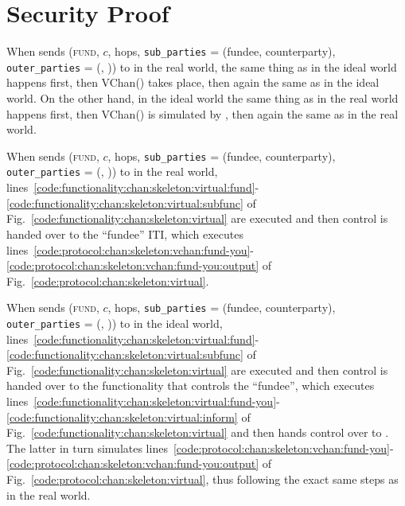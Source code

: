 \section{Security Proof}
  When \environment sends (\textsc{fund}, $c$, hops, \texttt{sub\_parties} =
  (fundee, counterparty), \texttt{outer\_parties} = (\charlie, \dave)) to \alice
  in the real world, the same thing as in the ideal world happens first, then
  VChan() takes place, then again the same as in the ideal world. On the other
  hand, in the ideal world the same thing as in the real world happens first,
  then VChan() is simulated by \simulator, then again the same as in the real
  world.

  When \environment sends (\textsc{fund}, $c$, hops, \texttt{sub\_parties} =
  (fundee, counterparty), \texttt{outer\_parties} = (\charlie, \dave)) to \alice
  in the real world,
  lines~\ref{code:functionality:chan:skeleton:virtual:fund}-\ref{code:functionality:chan:skeleton:virtual:subfunc}
  of Fig.~\ref{code:functionality:chan:skeleton:virtual} are executed and then
  control is handed over to the ``fundee'' ITI, which executes
  lines~\ref{code:protocol:chan:skeleton:vchan:fund-you}-\ref{code:protocol:chan:skeleton:vchan:fund-you:output}
  of Fig.~\ref{code:protocol:chan:skeleton:virtual}.

  When \environment sends (\textsc{fund}, $c$, hops, \texttt{sub\_parties} =
  (fundee, counterparty), \texttt{outer\_parties} = (\charlie, \dave)) to \alice
  in the ideal world,
  lines~\ref{code:functionality:chan:skeleton:virtual:fund}-\ref{code:functionality:chan:skeleton:virtual:subfunc}
  of Fig.~\ref{code:functionality:chan:skeleton:virtual} are executed and then
  control is handed over to the functionality that controls the ``fundee'', which executes
  lines~\ref{code:functionality:chan:skeleton:virtual:fund-you}-\ref{code:functionality:chan:skeleton:virtual:inform}
  of Fig.~\ref{code:functionality:chan:skeleton:virtual} and then hands control
  over to \simulator. The latter in turn simulates
  lines~\ref{code:protocol:chan:skeleton:vchan:fund-you}-\ref{code:protocol:chan:skeleton:vchan:fund-you:output}
  of Fig.~\ref{code:protocol:chan:skeleton:virtual}, thus following the exact
  same steps as in the real world.
